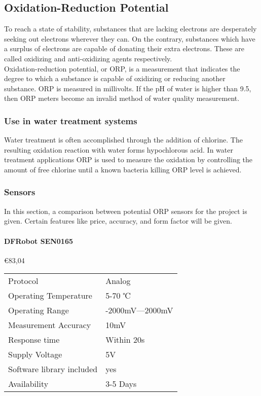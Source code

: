 \newpage
\subsection{Oxidation-Reduction Potential}
To reach a state of stability, substances that are lacking electrons are desperately seeking out electrons wherever they can. On the contrary, substances which have a surplus of electrons are capable of donating their extra electrons. These are called oxidizing and anti-oxidizing agents respectively.\\

Oxidation-reduction potential, or ORP, is a measurement that indicates the degree to which a substance is capable of oxidizing or reducing another substance. ORP is measured in millivolts.\cite{phorp} If the pH of water is higher than 9.5, then ORP meters become an invalid method of water quality measurement. \cite{standardmethods}

\subsubsection{Use in water treatment systems}
Water treatment is often accomplished through the addition of chlorine. The resulting oxidation reaction with water forms hypochlorous acid. In water treatment applications ORP is used to measure the oxidation by controlling the amount of free chlorine until a known bacteria killing ORP level is achieved. \cite{hamilton}

\subsubsection{Sensors}
In this section, a comparison between potential ORP sensors for the project is given. Certain features like price, accuracy, and form factor will be given.

\paragraph{DFRobot SEN0165}\mbox{€83,04} \cite{SEN0165}
\begin{table}[h!]
	\centering
	\quad
	\begin{tabular}{| l | l |}
    \hline
    Protocol & Analog\\
    Operating Temperature & 5-70 ℃ \\
    Operating Range &  -2000mV—2000mV\\
    Measurement Accuracy &  10mV \\
    Response time & Within 20s \\
    Supply Voltage & 5V \\
    Software library included & yes \\
    Availability & 3-5 Days \\
    \hline
	\end{tabular}
\end{table}

